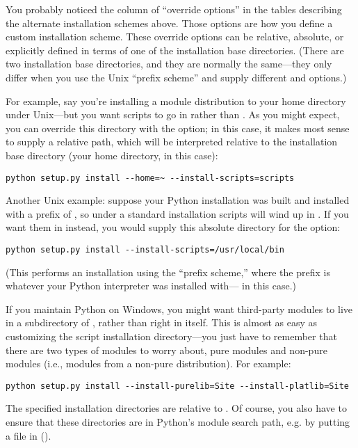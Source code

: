 \documentclass{howto}
\begin{document}
You probably noticed the column of ``override options'' in the tables
describing the alternate installation schemes above.  Those options are
how you define a custom installation scheme.  These override options can
be relative, absolute, or explicitly defined in terms of one of the
installation base directories.  (There are two installation base
directories, and they are normally the same---they only differ when you
use the Unix ``prefix scheme'' and supply different
 and  options.)

For example, say you're installing a module distribution to your home
directory under Unix---but you want scripts to go in
 rather than .
As you might expect, you can override this directory with the
 option; in this case, it makes most
sense to supply a relative path, which will be interpreted relative to
the installation base directory (your home directory, in this case):
\begin{verbatim}
python setup.py install --home=~ --install-scripts=scripts
\end{verbatim}

Another Unix example: suppose your Python installation was built and
installed with a prefix of , so under a standard 
installation scripts will wind up in .  If
you want them in  instead, you would supply this
absolute directory for the  option:
\begin{verbatim}
python setup.py install --install-scripts=/usr/local/bin
\end{verbatim}
(This performs an installation using the ``prefix scheme,'' where the
prefix is whatever your Python interpreter was installed with---
 in this case.)

If you maintain Python on Windows, you might want third-party modules to
live in a subdirectory of , rather than right in
 itself.  This is almost as easy as customizing the
script installation directory---you just have to remember that there are
two types of modules to worry about, pure modules and non-pure modules
(i.e., modules from a non-pure distribution).  For example:
\begin{verbatim}
python setup.py install --install-purelib=Site --install-platlib=Site
\end{verbatim}
The specified installation directories are relative to .
Of course, you also have to ensure that these directories are in
Python's module search path, e.g. by putting a  file in
 ().
\end{document}
